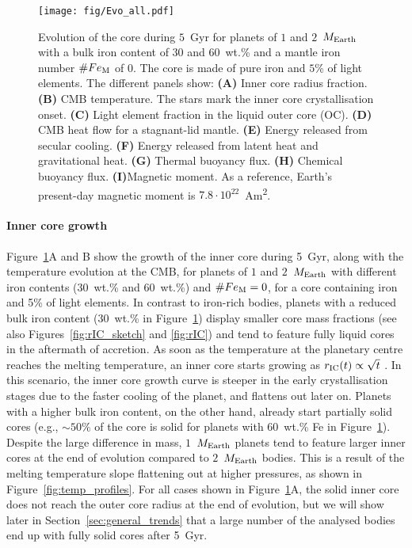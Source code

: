 \documentclass[draft]{agujournal2019} %
\begin{document}
\begin{figure}
\texttt{[image: fig/Evo\_all.pdf]}
\caption{Evolution of the core during $5$~Gyr for planets of $1$ and $2$~$M_{\rm Earth}$ with a bulk iron content of $30$ and $60$~wt.\% and a mantle iron number $\#Fe_{\rm M}$ of $0$. The core is made of pure iron and $5$\% of light elements. The different panels show: \textbf{(A)} Inner core radius fraction. \textbf{(B)} CMB temperature. The stars mark the inner core crystallisation onset. \textbf{(C)} Light element fraction in the liquid outer core (OC). \textbf{(D)} CMB heat flow for a stagnant-lid mantle. \textbf{(E)} Energy released from secular cooling. \textbf{(F)} Energy released from latent heat and gravitational heat. \textbf{(G)} Thermal buoyancy flux. \textbf{(H)} Chemical buoyancy flux. \textbf{(I)}Magnetic moment. As a reference, Earth's present-day magnetic moment is $7.8 \cdot 10^{22}$~Am\textsuperscript{2}.}
\label{fig:Evo_all}
\end{figure}

\paragraph*{Inner core growth}

Figure~\ref{fig:Evo_all}A and B show the growth of the inner core during 5~Gyr, along with the temperature evolution at the CMB, for planets of $1$ and $2$~$M_{\rm Earth}$ with different iron contents ($30$~wt.\% and $60$~wt.\%) and $\#Fe_{\rm M}=0$, for a core containing iron and 5\% of light elements. In contrast to iron-rich bodies, planets with a reduced bulk iron content ($30$~wt.\% in Figure~\ref{fig:Evo_all}) display smaller core mass fractions (see also Figures~\ref{fig:rIC_sketch} and \ref{fig:rIC}) and tend to feature fully liquid cores in the aftermath of accretion. As soon as the temperature at the planetary centre reaches the melting temperature, an inner core starts growing as $r_{\rm IC}(t)\propto \sqrt{t}$ \cite{labrosse_thermal_2003,labrosse_thermal_2015}. In this scenario, the inner core growth curve is steeper in the early crystallisation stages due to the faster cooling of the planet, and flattens out later on. Planets with a higher bulk iron content, on the other hand, already start partially solid cores (e.g., $\sim 50\%$ of the core is solid for planets with $60$~wt.\% Fe in Figure~\ref{fig:Evo_all}). Despite the large difference in mass, $1$~$M_{\rm Earth}$ planets tend to feature larger inner cores at the end of evolution compared to $2$~$M_{\rm Earth}$ bodies. This is a result of the melting temperature slope flattening out at higher pressures, as shown in Figure~\ref{fig:temp_profiles}. For all cases shown in Figure~\ref{fig:Evo_all}A, the solid inner core does not reach the outer core radius at the end of evolution, but we will show later in Section~\ref{sec:general_trends} that a large number of the analysed bodies end up with fully solid cores after 5~Gyr. 
\end{document}
